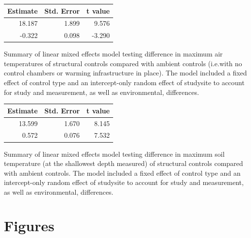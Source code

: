 \documentclass{article}
\begin{document}
\par
\begin{tabular}{rrr}
  \hline
Estimate & Std. Error & t value \\ 
  \hline
18.187 & 1.899 & 9.576 \\ 
  -0.322 & 0.098 & -3.290 \\ 
   \hline
\end{tabular}\par Summary of linear mixed effects model testing difference in maximum air temperatures of structural controls compared with ambient controls (i.e.with no control chambers or warming infrastructure in place). The model included a fixed effect of control type and an intercept-only random effect of studysite to account for study and measurement, as well as environmental, differences.
\par
\begin{tabular}{rrr}
  \hline
Estimate & Std. Error & t value \\ 
  \hline
13.599 & 1.670 & 8.145 \\ 
  0.572 & 0.076 & 7.532 \\ 
   \hline
\end{tabular}\par Summary of linear mixed effects model testing difference in maximum soil temperature (at the shallowest depth measured) of structural controls compared with ambient controls. The model included a fixed effect of control type and an intercept-only random effect of studysite to account for study and measurement, as well as environmental, differences.
\par
\section* {Figures}
\end{document}
